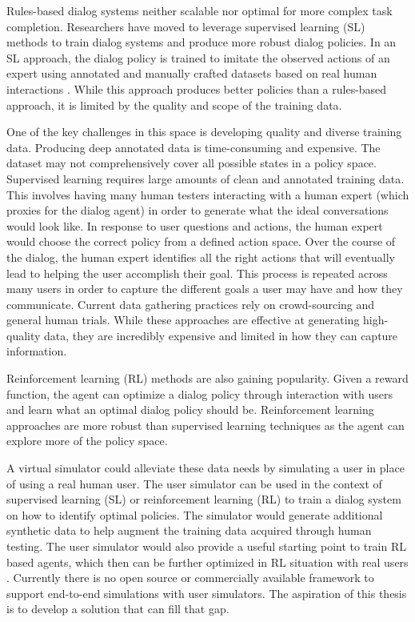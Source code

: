 Rules-based dialog systems neither scalable nor optimal for more complex task completion. Researchers have moved to leverage supervised learning (SL) methods to train dialog systems and produce more robust dialog policies. In an SL approach, the dialog policy is trained to imitate the observed actions of an expert using annotated and manually crafted datasets based on real human interactions \cite{Schatzmann2006ASO}. While this approach produces better policies than a rules-based approach, it is limited by the quality and scope of the training data. 

One of the key challenges in this space is developing quality and diverse training data. Producing deep annotated data is time-consuming and expensive. The dataset may not comprehensively cover all possible states in a policy space. Supervised learning requires large amounts of clean and annotated training data. This involves having many human testers interacting with a human expert (which proxies for the dialog agent) in order to generate what the ideal conversations would look like. In response to user questions and actions, the human expert would choose the correct policy from a defined action space. Over the course of the dialog, the human expert identifies all the right actions that will eventually lead to helping the user accomplish their goal. This process is repeated across many users in order to capture the different goals a user may have and how they communicate. Current data gathering practices rely on crowd-sourcing and general human trials. While these approaches are effective at generating high-quality data, they are incredibly expensive and limited in how they can capture information.  

Reinforcement learning (RL) methods are also gaining popularity. Given a reward function, the agent can optimize a dialog policy through interaction with users and learn what an optimal dialog policy should be. Reinforcement learning approaches are more robust than supervised learning techniques as the agent can explore more of the policy space.

A virtual simulator could alleviate these data needs by simulating a user in place of using a real human user. The user simulator can be used in the context of supervised learning (SL) or reinforcement learning (RL) to train a dialog system on how to identify optimal policies. The simulator would generate additional synthetic data to help augment the training data acquired through human testing. The user simulator would also provide a useful starting point to train RL based agents, which then can be further optimized in RL situation with real users \cite{li_usersim}. Currently there is no open source or commercially available framework to support end-to-end simulations with user simulators. The aspiration of this thesis is to develop a solution that can fill that gap. 

